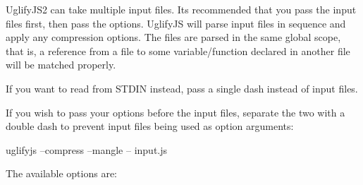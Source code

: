 Uglify\+J\+S2 can take multiple input files. It\textquotesingle{}s recommended that you pass the input files first, then pass the options. Uglify\+JS will parse input files in sequence and apply any compression options. The files are parsed in the same global scope, that is, a reference from a file to some variable/function declared in another file will be matched properly.

If you want to read from S\+T\+D\+IN instead, pass a single dash instead of input files.

If you wish to pass your options before the input files, separate the two with a double dash to prevent input files being used as option arguments\+: \begin{DoxyVerb}uglifyjs --compress --mangle -- input.js
\end{DoxyVerb}


The available options are\+:

